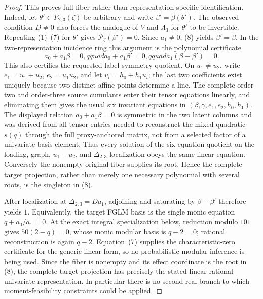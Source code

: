 \documentclass{article}
\begin{document}
\begin{proof}
This proves full-fiber rather than representation-specific identification.  Indeed, let \(\theta'\in F_{2,3}(\zeta)\) be arbitrary and write \(\beta'=\beta(\theta')\).  The observed condition \(D\ne0\) also forces the analogue of \(V\) and \(\Lambda_3\) for \(\theta'\) to be invertible.  Repeating (1)--(7) for \(\theta'\) gives \(\mathcal P_\zeta(\beta')=0\).  Since \(a_1\ne0\), (8) yields \(\beta'=\beta\).  In the two-representation incidence ring this argument is the polynomial certificate
\[
 a_0+a_1\beta=0,qquad a_0+a_1\beta'=0,qquad
 a_1(\beta-\beta')=0.
\]
This also certifies the requested label-symmetry quotient.  On \(u_1\ne u_2\), write \(e_1=u_1+u_2\), \(e_2=u_1u_2\), and let \(v_i=h_0+h_1u_i\); the last two coefficients exist uniquely because two distinct affine points determine a line.  The complete order-two and order-three source cumulants enter their tensor equations linearly, and eliminating them gives the usual six invariant equations in \((\beta,\gamma,e_1,e_2,h_0,h_1)\).  The displayed relation \(a_0+a_1\beta=0\) is symmetric in the two latent columns and was derived from all tensor entries needed to reconstruct the mixed quadratic \(s(q)\) through the full proxy-anchored matrix, not from a selected factor of a univariate basis element.  Thus every solution of the six-equation quotient on the loading, graph, \(u_1-u_2\), and \(\Delta_{2,3}\) localization obeys the same linear equation.  Conversely the nonempty original fiber supplies its root.  Hence the complete target projection, rather than merely one necessary polynomial with several roots, is the singleton in (8).

After localization at \(\Delta_{2,3}=Da_1\), adjoining and saturating by \(\beta-\beta'\) therefore yields \(1\).  Equivalently, the target FGLM basis is the single monic equation \(q+a_0/a_1=0\).  At the exact integral specialization below, reduction modulo \(101\) gives \(50(2-q)=0\), whose monic modular basis is \(q-2=0\); rational reconstruction is again \(q-2\).  Equation~(7) supplies the characteristic-zero certificate for the generic linear form, so no probabilistic modular inference is being used.  Since the fiber is nonempty and its effect coordinate is the root in (8), the complete target projection has precisely the stated linear rational-univariate representation.  In particular there is no second real branch to which moment-feasibility constraints could be applied.


\end{proof}
\end{document}

